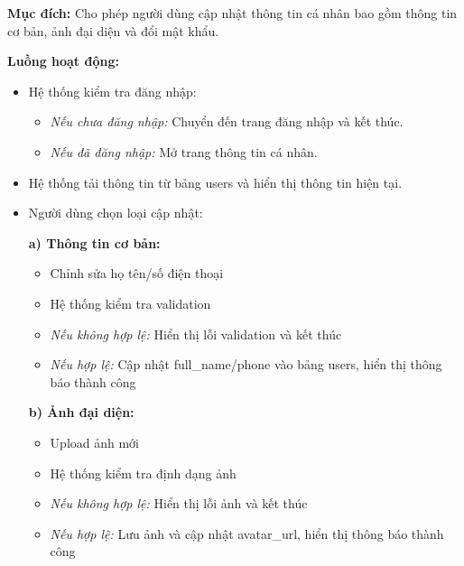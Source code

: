 \textbf{Mục đích:} Cho phép người dùng cập nhật thông tin cá nhân bao gồm thông tin cơ bản, ảnh đại diện và đổi mật khẩu.

\textbf{Luồng hoạt động:}

\begin{itemize}
    \item Hệ thống kiểm tra đăng nhập:
    \begin{itemize}
        \item \textit{Nếu chưa đăng nhập:} Chuyển đến trang đăng nhập và kết thúc.
        \item \textit{Nếu đã đăng nhập:} Mở trang thông tin cá nhân.
    \end{itemize}
    \item Hệ thống tải thông tin từ bảng users và hiển thị thông tin hiện tại.
    \item Người dùng chọn loại cập nhật:
    
    \textbf{a) Thông tin cơ bản:}
    \begin{itemize}
        \item Chỉnh sửa họ tên/số điện thoại
        \item Hệ thống kiểm tra validation
        \item \textit{Nếu không hợp lệ:} Hiển thị lỗi validation và kết thúc
        \item \textit{Nếu hợp lệ:} Cập nhật full\_name/phone vào bảng users, hiển thị thông báo thành công
    \end{itemize}
    
    \textbf{b) Ảnh đại diện:}
    \begin{itemize}
        \item Upload ảnh mới
        \item Hệ thống kiểm tra định dạng ảnh
        \item \textit{Nếu không hợp lệ:} Hiển thị lỗi ảnh và kết thúc
        \item \textit{Nếu hợp lệ:} Lưu ảnh và cập nhật avatar\_url, hiển thị thông báo thành công
    \end{itemize}
    

\end{itemize}
